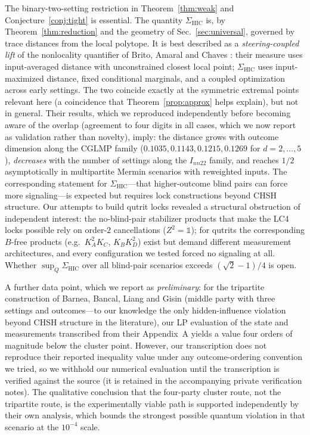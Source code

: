 \documentclass[10pt,twocolumn]{article}
\newcommand{\Sig}{\Sigma_{\mathrm{HIC}}}
\begin{document}
The binary-two-setting restriction in Theorem~\ref{thm:weak} and Conjecture~\ref{conj:tight} is essential. The quantity $\Sig$ is, by Theorem~\ref{thm:reduction} and the geometry of Sec.~\ref{sec:universal}, governed by trace distances from the local polytope. It is best described as a \emph{steering-coupled lift} of the nonlocality quantifier of Brito, Amaral and Chaves \cite{Brito2018}: their measure uses input-averaged distance with unconstrained closest local point; $\Sig$ uses input-maximized distance, fixed conditional marginals, and a coupled optimization across early settings. The two coincide exactly at the symmetric extremal points relevant here (a coincidence that Theorem~\ref{prop:approx} helps explain), but not in general. Their results, which we reproduced independently before becoming aware of the overlap (agreement to four digits in all cases, which we now report as validation rather than novelty), imply: the distance grows with outcome dimension along the CGLMP family ($0.1035, 0.1143, 0.1215, 0.1269$ for $d=2,\dots,5$), \emph{decreases} with the number of settings along the $I_{nn22}$ family, and reaches $1/2$ asymptotically in multipartite Mermin scenarios with reweighted inputs. The corresponding statement for $\Sig$---that higher-outcome blind pairs can force more signaling---is expected but requires lock constructions beyond CHSH structure. Our attempts to build qutrit locks revealed a structural obstruction of independent interest: the no-blind-pair stabilizer products that make the LC4 locks possible rely on order-$2$ cancellations ($Z^2=\mathbb 1$); for qutrits the corresponding $B$-free products (e.g.\ $K_A^2K_C$, $K_BK_D^2$) exist but demand different measurement architectures, and every configuration we tested forced no signaling at all. Whether $\sup_Q \Sig$ over all blind-pair scenarios exceeds $(\sqrt2-1)/4$ is open.

A further data point, which we report as \emph{preliminary}: for the tripartite construction of Barnea, Bancal, Liang and Gisin \cite{Barnea2013} (middle party with three settings and outcomes---to our knowledge the only hidden-influence violation beyond CHSH structure in the literature), our LP evaluation of the state and measurements transcribed from their Appendix~A yields a value four orders of magnitude below the cluster point. However, our transcription does not reproduce their reported inequality value under any outcome-ordering convention we tried, so we withhold our numerical evaluation until the transcription is verified against the source (it is retained in the accompanying private verification notes). The qualitative conclusion that the four-party cluster route, not the tripartite route, is the experimentally viable path is supported independently by their own analysis, which bounds the strongest possible quantum violation in that scenario at the $10^{-4}$ scale.
\end{document}
